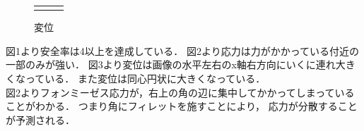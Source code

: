 \begin{figure}[H]
\begin{tabular}{ccc}
\begin{minipage}{.33\textwidth}
        \caption{変位}
        \label{img:disp1}
      \end{minipage}
    \end{tabular}
  \end{figure}

  図1より安全率は4以上を達成している．
  図2より応力は力がかかっている付近の一部のみが強い．
  図3より変位は画像の水平左右のx軸右方向にいくに連れ大きくなっている．
  また変位は同心円状に大きくなっている．\\\indent
  図2よりフォンミーゼス応力が，右上の角の辺に集中してかかってしまっていることがわかる．
  つまり角にフィレットを施すことにより，
  応力が分散することが予測される．
